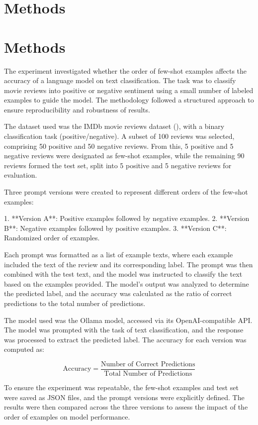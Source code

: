\documentclass{article}
\begin{document}
\section{Methods}
\section{Methods}

The experiment investigated whether the order of few-shot examples affects the accuracy of a language model on text classification. The task was to classify movie reviews into positive or negative sentiment using a small number of labeled examples to guide the model. The methodology followed a structured approach to ensure reproducibility and robustness of results.

The dataset used was the IMDb movie reviews dataset (\cite{imdb}), with a binary classification task (positive/negative). A subset of 100 reviews was selected, comprising 50 positive and 50 negative reviews. From this, 5 positive and 5 negative reviews were designated as few-shot examples, while the remaining 90 reviews formed the test set, split into 5 positive and 5 negative reviews for evaluation.

Three prompt versions were created to represent different orders of the few-shot examples:

1. **Version A**: Positive examples followed by negative examples.
2. **Version B**: Negative examples followed by positive examples.
3. **Version C**: Randomized order of examples.

Each prompt was formatted as a list of example texts, where each example included the text of the review and its corresponding label. The prompt was then combined with the test text, and the model was instructed to classify the text based on the examples provided. The model's output was analyzed to determine the predicted label, and the accuracy was calculated as the ratio of correct predictions to the total number of predictions.

The model used was the Ollama model, accessed via its OpenAI-compatible API. The model was prompted with the task of text classification, and the response was processed to extract the predicted label. The accuracy for each version was computed as:

$$
\text{Accuracy} = \frac{\text{Number of Correct Predictions}}{\text{Total Number of Predictions}}
$$

To ensure the experiment was repeatable, the few-shot examples and test set were saved as JSON files, and the prompt versions were explicitly defined. The results were then compared across the three versions to assess the impact of the order of examples on model performance.
\end{document}
